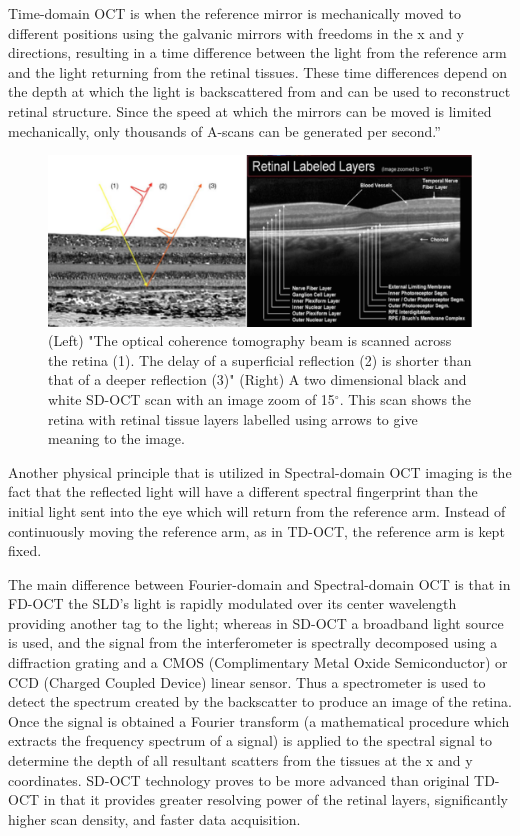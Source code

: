 Time-domain OCT is when the reference mirror is mechanically moved to different
positions using the galvanic mirrors with freedoms in the x and y directions,
resulting in a time difference between the light from the reference arm and the
light returning from the retinal tissues.  These time differences depend on the
depth at which the light is backscattered from and can be used to reconstruct
retinal structure.  Since the speed at which the mirrors can be moved is limited
mechanically, only thousands of A-scans can be generated per second.” \cite{mbib_4}

\begin{figure}[htbp]
\centering
\includegraphics{figures/morgan_4}
\caption{(Left) "The optical coherence tomography beam is scanned across the retina (1).
The delay of a superficial reflection (2) is shorter than that of a deeper reflection (3)" (Right) A two dimensional black and white SD-OCT scan with an image zoom of 15$^\circ$.\cite{mbib_6}  This scan shows the retina with retinal
tissue layers labelled using arrows to give meaning to the image.\cite{mbib_8} }
\label{fig:m_4}
\end{figure}

Another physical principle that is utilized in Spectral-domain OCT imaging is the
fact that the reflected light will have a different spectral fingerprint than the
initial light sent into the eye which will return from the reference arm.  Instead
of continuously moving the reference arm, as in TD-OCT, the reference arm is kept
fixed.

The main difference between Fourier-domain and Spectral-domain OCT is that in
FD-OCT the SLD’s light is rapidly modulated over its center wavelength providing
another tag to the light; whereas in SD-OCT a broadband light source is used,
and the signal from the interferometer is spectrally decomposed using a diffraction
grating and a CMOS (Complimentary Metal Oxide Semiconductor) or CCD (Charged Coupled Device) linear sensor.\cite{mbib_4}
Thus a spectrometer is used to detect the spectrum created by the backscatter to
produce an image of the retina.  Once the signal is obtained a Fourier transform
(a mathematical procedure which extracts the frequency spectrum of a signal) is
applied to the spectral signal to determine the depth of all resultant scatters from
the tissues at the x and y coordinates.\cite{mbib_4,mbib_9} SD-OCT technology
proves to be more advanced than original TD-OCT in that it provides greater
resolving power of the retinal layers, significantly higher scan density, and faster
data acquisition. \cite{mbib_2}

